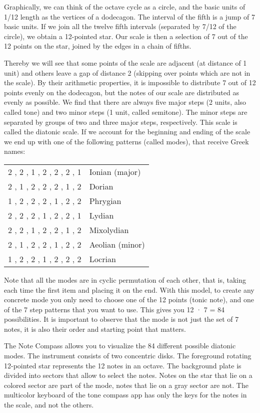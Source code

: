 Graphically, we can think of the octave cycle as a circle, and the basic units of 1/12 length as the vertices of a dodecagon. The interval of the fifth is a jump of 7 basic units. If we join all the twelve fifth intervals (separated by 7/12 of the circle), we obtain a 12-pointed star. Our scale is then a selection of 7 out of the 12 points on the star, joined by the edges in a chain of fifths.

Thereby we will see that some points of the scale are adjacent (at distance of 1 unit) and others  leave  a gap of distance 2 (skipping over points which are not in the scale). By their arithmetic properties, it is impossible to distribute 7 out of  12 points evenly on the dodecagon, but the notes of our scale are distributed as evenly as possible. We find that there are always five major steps (2 units, also called tone) and two minor steps (1 unit, called semitone). The minor steps are separated by groups of two and three major steps, respectively. This scale is called the diatonic scale. If we account for the beginning and ending of the scale we end up with one of the following patterns (called modes), that receive Greek names:

\begin{center}
\begin{tabular}{rl}
	2 , 2 , 1 , 2 , 2 , 2 , 1 & Ionian (major) \\
	2 , 1 , 2 , 2 , 2 , 1 , 2 & Dorian \\
	1 , 2 , 2 , 2 , 1 , 2 , 2 & Phrygian \\
	2 , 2 , 2 , 1 , 2 , 2 , 1 & Lydian \\
	2 , 2 , 1 , 2 , 2 , 1 , 2 & Mixolydian \\
	2 , 1 , 2 , 2 , 1 , 2 , 2 & Aeolian (minor) \\
	1 , 2 , 2 , 1 , 2 , 2 , 2 & Locrian \\
\end{tabular}
\end{center}

Note that all the modes are in cyclic permutation of each other, that is, taking each time the first item and placing it on the end. With this model, to create any concrete mode you only need to choose one of the 12 points (tonic note), and one of the 7 step patterns that you want to use. This gives you 12 · 7 = 84 possibilities. It is important to observe that the mode is not just the set of 7 notes, it is also their order and starting point that matters.

The Note Compass allows you to visualize the 84 different possible diatonic modes. The instrument consists of two concentric disks. The foreground rotating 12-pointed star represents the 12 notes in an octave. The background plate is divided into sectors that allow to select the notes. Notes on the star that lie on a colored sector are part of the mode, notes that lie on a gray sector are not. The multicolor keyboard of the tone compass app has only the keys for the notes in the scale, and not the others.

